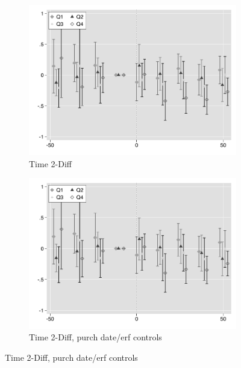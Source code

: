 \documentclass[12pt]{article}
\begin{document}
\begin{figure}
\begin{subfigure}[b]{0.48\textwidth}
        \end{subfigure}
        \begin{subfigure}[b]{0.48\textwidth}
                    \caption[Network2]%
            {{\footnotesize Time 2-Diff}}    
            \label{fig:prefor}
            \centering
            \includegraphics[width=\textwidth,trim={0.3cm .3cm 0.1cm 0cm}, clip=true]{figures/price_time_2d_no_ctrl_q}
        \end{subfigure}
        \hfill
        \begin{subfigure}[b]{0.48\textwidth}
                    \caption[Network2]%
            {{\footnotesize Time 2-Diff, purch date/erf controls}}    
            \label{fig:prefor}
            \centering
            \includegraphics[width=\textwidth,trim={0.3cm .3cm 0.1cm 0cm}, clip=true]{figures/price_time_2d_ctrl_q}
        \end{subfigure}
\end{figure}
\end{document}
